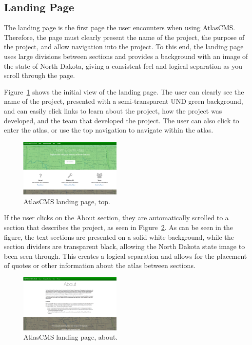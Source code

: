 \documentclass[11pt, final, conference, twocolumn]{IEEEtran}
\begin{document}
\subsection{Landing Page}
The landing page is the first page the user encounters when using AtlasCMS. Therefore, the page must clearly present the name of the project, the purpose of the project, and allow navigation into the project. To this end, the landing page uses large divisions between sections and provides a background with an image of the state of North Dakota, giving a consistent feel and logical separation as you scroll through the page.

Figure~\ref{fig:home_top} shows the initial view of the landing page. The user can clearly see the name of the project, presented with a semi-transparent UND green background, and can easily click links to learn about the project, how the project was developed, and the team that developed the project. The user can also click to enter the atlas, or use the top navigation to navigate within the atlas.

\begin{figure}[h!]
	\centering
	\includegraphics[width=0.45\textwidth]{home_top}
	\caption{AtlasCMS landing page, top.}
	\label{fig:home_top}
\end{figure}

If the user clicks on the About section, they are automatically scrolled to a section that describes the project, as seen in Figure~\ref{fig:home_about}. As can be seen in the figure, the text sections are presented on a solid white background, while the section dividers are transparent black, allowing the North Dakota state image to been seen through. This creates a logical separation and allows for the placement of quotes or other information about the atlas between sections.

\begin{figure}[h!]
	\centering
	\includegraphics[width=0.45\textwidth]{home_about}
	\caption{AtlasCMS landing page, about.}
	\label{fig:home_about}
\end{figure}
\end{document}
